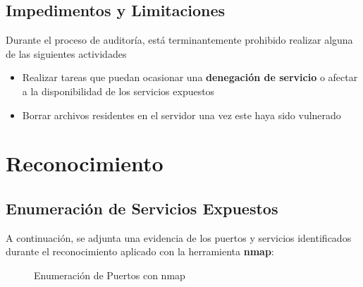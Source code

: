 \documentclass[a4paper]{article} %
\begin{document}
        \subsection{Impedimentos y Limitaciones}

        Durante el proceso de auditoría, está terminantemente prohibido realizar alguna de las siguientes actividades

        \begin{itemize}
                \item Realizar tareas que puedan ocasionar una \textbf{denegación de servicio} o afectar a la disponibilidad de los servicios expuestos
                \item Borrar archivos residentes en el servidor una vez este haya sido vulnerado
        \end{itemize}

        \clearpage


        \section{Reconocimiento}
        \subsection{Enumeración de Servicios Expuestos}

        A continuación, se adjunta una evidencia de los puertos y servicios identificados durante el reconocimiento aplicado con la herramienta \textbf{nmap}:

        \begin{figure}[h]
                \centering
                \setlength{\fboxrule}{0.8pt}
                \caption{Enumeración de Puertos con nmap}
        \end{figure}
\end{document}
